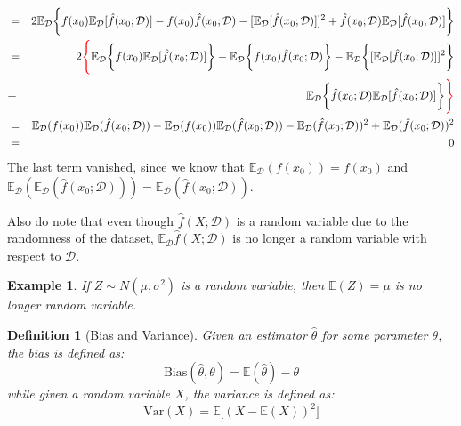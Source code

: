 \documentclass{article}
\theoremstyle{MyNonumberplain}
\theoremstyle{break}
\newcommand{\ev}{\mathbb{E}}
\newcommand{\evd}{\ev_{\mathcal{D}}}
\theoremstyle{break}
\newtheorem{example}{Example}[section]
\theoremstyle{break}
\theoremstyle{break}
\newtheorem{definition}{Definition}[section]
\begin{document}
\begin{thmbox}
    \begin{prfbox}
        \begin{eqnarray*}
            &=& 2 \evd \biggl\{f(x_0)\evd[\hat{f}(x_0;\mathcal{D})]-f(x_0)\hat{f}(x_0;\mathcal{D})-[\evd[\hat{f}(x_0;\mathcal{D})]]^2+\hat{f}(x_0;\mathcal{D})\evd[\hat{f}(x_0;\mathcal{D})]\biggr\} \\
            &=& 2  \textcolor{red}{\Biggl\{}\evd\biggl\{f(x_0)\evd[\hat{f}(x_0;\mathcal{D})]\biggr\}-\evd\biggl\{f(x_0)\hat{f}(x_0;\mathcal{D})\biggr\}-\evd\biggl\{[\evd[\hat{f}(x_0;\mathcal{D})]]^2\biggr\} \\
            &+& \evd\biggl\{\hat{f}(x_0;\mathcal{D})\evd[\hat{f}(x_0;\mathcal{D})]\biggr\}\textcolor{red}{\Biggr\}}\\
            &=& \evd(f(x_0))\evd(\hat{f}(x_0;\mathcal{D}))-\evd(f(x_0))\evd(\hat{f}(x_0;\mathcal{D}))-\evd(\hat{f}(x_0;\mathcal{D}))^2+\evd(\hat{f}(x_0;\mathcal{D}))^2\\
            &=& 0
        \end{eqnarray*}
        The last term vanished, since we know that $\evd(f(x_0))=f(x_0)$ and $\evd(\evd(\hat{f}(x_0;\mathcal{D}))) = \evd(\hat{f}(x_0;\mathcal{D})).$

        \bigskip
        Also do note that even though $\hat{f}(X;\mathcal{D})$ is a random variable due to the randomness of the dataset, $\evd\hat{f}(X;\mathcal{D})$ is 
        no longer a random variable with respect to $\mathcal{D}$.

        \begin{expbox}
            \begin{example}
                If $Z\sim N(\mu,\sigma^2)$ is a random variable, then $\ev(Z)=\mu$ is no longer random variable.
            \end{example}
        \end{expbox}

    \end{prfbox}
\end{thmbox}

\begin{defbox}
    \begin{definition}[Bias and Variance]
        Given an estimator $\hat{\theta}$ for some parameter $\theta$, the bias is defined as: 
        $$\text{Bias}(\hat{\theta},\theta)=\ev(\hat{\theta})-\theta$$
        while given a random variable $X$, the variance is defined as:
        $$
            \text{Var}(X)=\ev\bigl[(X-\ev(X))^2\bigr]
        $$
    \end{definition}
\end{defbox}
\end{document}
